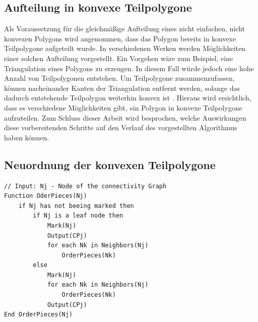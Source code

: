 \documentclass[ngerman]{seminarbeitrag}
\begin{document}
\subsection{Aufteilung in konvexe Teilpolygone}\label{aufteilung}
Als Voraussetzung für die gleichmäßige Aufteilung eines nicht einfachen, nicht konvexen Polygons wird angenommen, dass das Polygon bereits in konvexe Teilpolygone aufgeteilt wurde. In verschiedenen Werken werden Möglichkeiten einer solchen Aufteilung vorgestellt. Ein Vorgehen wäre zum Beispiel, eine Triangulation eines Polygons zu erzeugen. In diesem Fall würde jedoch eine hohe Anzahl von Teilpolygonen entstehen. Um Teilpolygone zusammenzufassen, können nacheinander Kanten der Triangulation entfernt werden, solange das dadurch entstehende Teilpolygon weiterhin konvex ist \cite{Schachter.1978}.
Hieraus wird ersichtlich, dass es verschiedene Möglichkeiten gibt, ein Polygon in konvexe Teilpolygone aufzuteilen. Zum Schluss dieser Arbeit wird besprochen, welche Auswirkungen diese vorbereitenden Schritte auf den Verlauf des vorgestellten Algorithmus haben können.

\subsection{Neuordnung der konvexen Teilpolygone}\label{ordnung}

\begin{lstlisting}[float,caption={Der Algorithmus \ord}, frame=single, label=orderpieces]
// Input: Nj - Node of the connectivity Graph
Function OderPieces(Nj)
    if Nj has not beeing marked then
        if Nj is a leaf node then    
            Mark(Nj)
            Output(CPj)
            for each Nk in Neighbors(Nj)
                OrderPieces(Nk)
        else
            Mark(Nj)
            for each Nk in Neighbors(Nj)
                OrderPieces(Nk)
            Output(CPj)
End OrderPieces(Nj)  
\end{lstlisting}
\end{document}
